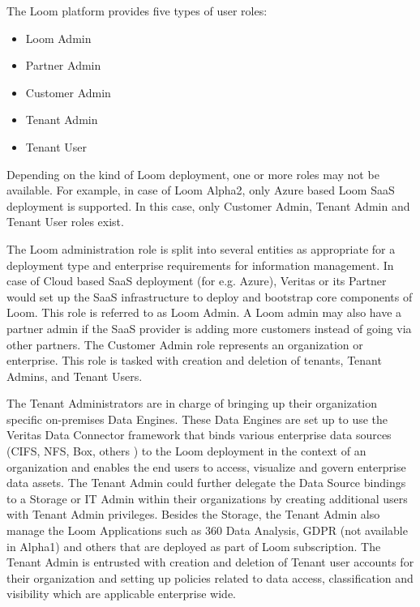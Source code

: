 \documentclass[letterpaper,10pt,english]{sphinxmanual}
\begin{document}
The Loom platform provides five types of user roles:
\begin{itemize}
\item {} 
Loom Admin

\item {} 
Partner Admin

\item {} 
Customer Admin

\item {} 
Tenant Admin

\item {} 
Tenant User

\end{itemize}

Depending on the kind of Loom deployment, one or more roles may not be available. For example, in case of Loom Alpha2, only Azure based Loom SaaS deployment is supported. In this case, only Customer Admin, Tenant Admin and Tenant User roles exist.

The Loom administration role is split into several entities as appropriate for a deployment type and enterprise requirements for information management. In case of Cloud based SaaS deployment (for e.g. Azure), Veritas or its Partner would set up the SaaS infrastructure to deploy and bootstrap core components of Loom. This role is referred to as Loom Admin. A Loom admin may also have a partner admin if the SaaS provider is adding more customers instead of going via other partners. The Customer Admin role represents an organization or enterprise. This role is tasked with creation and deletion of tenants, Tenant Admins, and Tenant Users.

The Tenant Administrators are in charge of bringing up their organization specific on-premises Data Engines. These Data Engines are set up to use the Veritas Data Connector framework that binds various enterprise data sources (CIFS, NFS, Box, others ) to the Loom deployment in the context of an organization and enables the end users to access, visualize and govern enterprise data assets. The Tenant Admin could further delegate the Data Source bindings to a Storage or IT Admin within their organizations by creating additional users with Tenant Admin privileges. Besides the Storage, the Tenant Admin also manage the Loom Applications such as 360 Data Analysis, GDPR (not available in Alpha1) and others that are deployed as part of Loom subscription. The Tenant Admin is entrusted with creation and deletion of Tenant user accounts for their organization and setting up policies related to data access, classification and visibility which are applicable enterprise wide.
\end{document}
